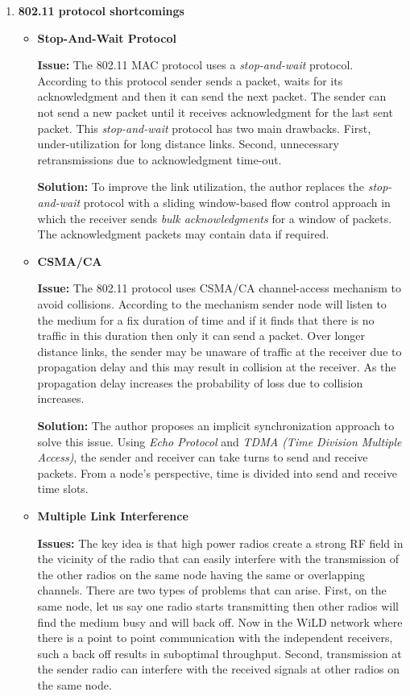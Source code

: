 \documentclass{article}
\begin{document}
\begin{enumerate}
    \item \textbf{802.11 protocol shortcomings}
    \begin{itemize}
        \item \textbf{Stop-And-Wait Protocol}
        \par \textbf{Issue:} The 802.11 MAC protocol uses a \textit{stop-and-wait} protocol. According to this protocol sender sends a packet, waits for its acknowledgment and then it can send the next packet. The sender can not send a new packet until it receives acknowledgment for the last sent packet. This \textit{stop-and-wait} protocol has two main drawbacks. First, under-utilization for long distance links. Second, unnecessary retransmissions due to acknowledgment time-out.
        \par \textbf{Solution:} To improve the link utilization, the author replaces the \textit{stop-and-wait} protocol with a sliding window-based flow control approach in which the receiver sends \textit{bulk acknowledgments} for a window of packets. The acknowledgment packets may contain data if required.
        \item \textbf{CSMA/CA}
        \par \textbf{Issue:} The 802.11 protocol uses CSMA/CA channel-access mechanism to avoid collisions. According to the mechanism sender node will listen to the medium for a fix duration of time and if it finds that there is no traffic in this duration then only it can send a packet. Over longer distance links, the sender may be unaware of traffic at the receiver due to propagation delay and this may result in collision at the receiver. As the propagation delay increases the probability of loss due to collision increases.
        \par \textbf{Solution:} The author proposes an implicit synchronization approach to solve this issue. Using \textit{Echo Protocol} and \textit{TDMA (Time Division Multiple Access)}, the sender and receiver can take turns to send and receive packets. From a node's perspective, time is divided into send and receive time slots.
        \item \textbf{Multiple Link Interference}
        \par \textbf{Issues:} The key idea is that high power radios create a strong RF field in the vicinity of the radio that can easily interfere with the transmission of the other radios on the same node having the same or overlapping channels. There are two types of problems that can arise. First, on the same node, let us say one radio starts transmitting then other radios will find the medium busy and will back off. Now in the WiLD network where there is a point to point communication with the independent receivers, such a back off results in suboptimal throughput. Second, transmission at the sender radio can interfere with the received signals at other radios on the same node.

\end{itemize}
\end{enumerate}
\end{document}
